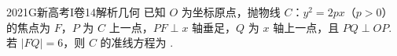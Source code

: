 
\begin{problem}{2021}{G}{新高考I卷}{14}{解析几何}
已知 $ O $ 为坐标原点，抛物线 $ C $：$ y^2=2px $（$ p>0 $）的焦点为 $ F $，$ P $ 为 $ C $ 上一点，$ PF\perp x $ 轴垂足，$ Q $ 为 $ x $ 轴上一点，且 $ PQ\perp OP $.若 $ |FQ|=6 $，则 $ C $ 的准线方程为 \underline{\hspace{4em}}.
\end{problem}

\begin{answer}

\end{answer}

\begin{solutions}

\end{solutions}